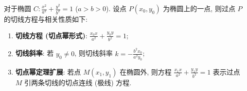 \begin{statementbox}
对于椭圆 $C: \frac{x^2}{a^2} + \frac{y^2}{b^2} = 1$ ($a>b>0$). 设点 $P(x_0, y_0)$ 为椭圆上的一点, 则过点 $P$ 的切线方程与相关性质如下:
\begin{enumerate}
    \item \textbf{切线方程 (切点幂形式)}: $\frac{x_0x}{a^2} + \frac{y_0y}{b^2} = 1$;
    \item \textbf{切线斜率}: 若 $y_0 \neq 0$, 则切线斜率 $k = -\frac{b^2x_0}{a^2y_0}$;
    \item \textbf{切点幂定理扩展}: 若点 $M(x_1, y_1)$ 在椭圆外, 则方程 $\frac{x_1x}{a^2} + \frac{y_1y}{b^2} = 1$ 表示过点 $M$ 引两条切线的切点连线 (极线) 方程.
\end{enumerate}
\end{statementbox}